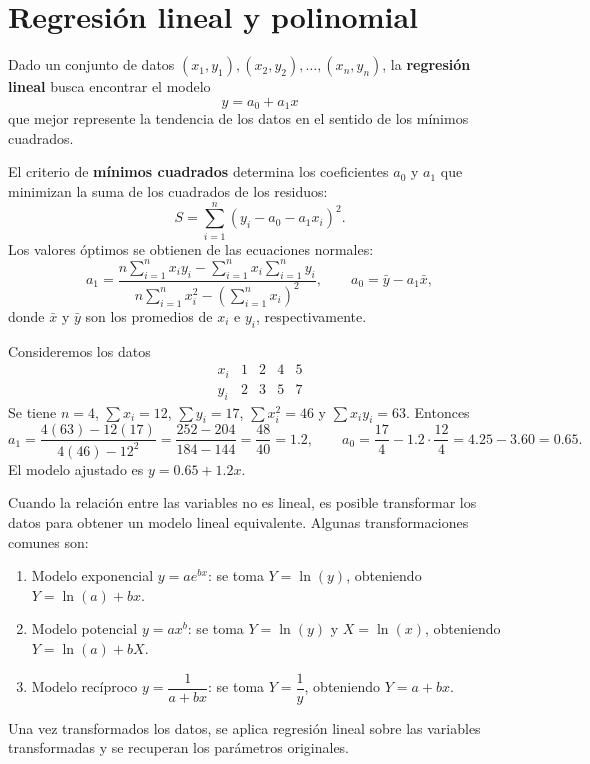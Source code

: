 \documentclass[a4,11pt]{aleph-notas}
\begin{document}
\encabezado


\section{Regresión lineal y polinomial}

\begin{defi}
    Dado un conjunto de datos $(x_1,y_1),(x_2,y_2),\ldots,(x_n,y_n)$, la \textbf{regresión lineal} busca encontrar el modelo
    \[
        y = a_0 + a_1 x
    \]
    que mejor represente la tendencia de los datos en el sentido de los mínimos cuadrados.
\end{defi}

\begin{defi}
    El criterio de \textbf{mínimos cuadrados} determina los coeficientes $a_0$ y $a_1$ que minimizan la suma de los cuadrados de los residuos:
    \[
        S = \sum_{i=1}^{n}(y_i - a_0 - a_1 x_i)^2.
    \]
    Los valores óptimos se obtienen de las ecuaciones normales:
    \[
        a_1 = \frac{n\displaystyle\sum_{i=1}^{n}x_i y_i - \displaystyle\sum_{i=1}^{n}x_i\displaystyle\sum_{i=1}^{n}y_i}{n\displaystyle\sum_{i=1}^{n}x_i^2 - \left(\displaystyle\sum_{i=1}^{n}x_i\right)^2},
        \qquad
        a_0 = \bar{y} - a_1\bar{x},
    \]
    donde $\bar{x}$ y $\bar{y}$ son los promedios de $x_i$ e $y_i$, respectivamente.
\end{defi}

\begin{ejem}
    Consideremos los datos
    \[
        \begin{array}{c|cccc}
            x_i & 1 & 2 & 4 & 5\\
            \hline
            y_i & 2 & 3 & 5 & 7
        \end{array}
    \]
    Se tiene $n=4$, $\sum x_i=12$, $\sum y_i=17$, $\sum x_i^2=46$ y $\sum x_iy_i=63$. Entonces
    \[
        a_1 = \frac{4(63)-12(17)}{4(46)-12^2} = \frac{252-204}{184-144} = \frac{48}{40} = 1.2,
        \qquad
        a_0 = \frac{17}{4}-1.2\cdot\frac{12}{4} = 4.25-3.60 = 0.65.
    \]
    El modelo ajustado es $y = 0.65 + 1.2x$.
\end{ejem}

\begin{defi}
    Cuando la relación entre las variables no es lineal, es posible transformar los datos para obtener un modelo lineal equivalente. Algunas transformaciones comunes son:
    \begin{enumerate}
        \item Modelo exponencial $y=ae^{bx}$: se toma $Y=\ln(y)$, obteniendo $Y=\ln(a)+bx$.
        \item Modelo potencial $y=ax^b$: se toma $Y=\ln(y)$ y $X=\ln(x)$, obteniendo $Y=\ln(a)+bX$.
        \item Modelo recíproco $y=\dfrac{1}{a+bx}$: se toma $Y=\dfrac{1}{y}$, obteniendo $Y=a+bx$.
    \end{enumerate}
    Una vez transformados los datos, se aplica regresión lineal sobre las variables transformadas y se recuperan los parámetros originales.
\end{defi}
\end{document}
